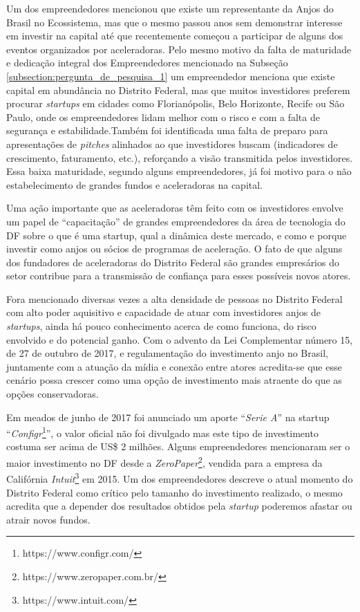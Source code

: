 Um dos empreendedores mencionou que existe um representante da Anjos do Brasil no Ecossistema, mas que o mesmo passou anos sem demonstrar interesse em investir na capital até que recentemente começou a participar de alguns dos eventos organizados por aceleradoras. Pelo mesmo motivo da falta de maturidade e dedicação integral dos Empreendedores mencionado na Subseção \ref{subsection:pergunta_de_pesquisa_1} um empreendedor menciona que existe capital em abundância no Distrito Federal, mas que muitos investidores preferem procurar \textit{startups} em cidades como Florianópolis, Belo Horizonte, Recife ou São Paulo, onde os empreendedores lidam melhor com o risco e com a falta de segurança e estabilidade.Também foi identificada uma falta de preparo para apresentações de \textit{pitches} alinhados ao que investidores buscam (indicadores de crescimento, faturamento, etc.), reforçando a visão transmitida pelos investidores. Essa baixa maturidade, segundo alguns empreendedores, já foi motivo para o não estabelecimento de grandes fundos e aceleradoras na capital.

Uma ação importante que as aceleradoras têm feito com os investidores envolve um papel de ``capacitação'' de grandes empreendedores da área de tecnologia do DF sobre o que é uma startup, qual a dinâmica deste mercado, e como e porque investir como anjos ou sócios de programas de aceleração. O fato de que alguns dos fundadores de aceleradoras do Distrito Federal são grandes empresários do setor contribue para a transmissão de confiança para esses possíveis novos atores. 

Fora mencionado diversas vezes a alta densidade de pessoas no Distrito Federal com alto poder aquisitivo e capacidade de atuar com investidores anjos de \textit{startups}, ainda há pouco conhecimento acerca de como funciona, do risco envolvido e do potencial ganho. Com o advento da Lei Complementar número 15, de 27 de outubro de 2017, e regulamentação do investimento anjo no Brasil, juntamente com a atuação da mídia e conexão entre atores acredita-se que esse cenário possa crescer como uma opção de investimento mais atraente do que as opções conservadoras.

Em meados de junho de 2017 foi anunciado um aporte ``\textit{Serie A}'' na startup ``\textit{Configr}\footnote{https://www.configr.com/}'', o valor oficial não foi divulgado mas este tipo de investimento costuma ser acima de US\$ 2 milhões. Alguns empreendedores mencionaram ser o maior investimento no DF desde a \textit{ZeroPaper}\footnote{https://www.zeropaper.com.br/}, vendida para a empresa da Califórnia \textit{Intuit}\footnote{https://www.intuit.com/} em 2015. Um dos empreendedores descreve o atual momento do Distrito Federal como crítico pelo tamanho do investimento realizado, o mesmo acredita que a depender dos resultados obtidos pela \textit{startup} poderemos afastar ou atrair novos fundos.

